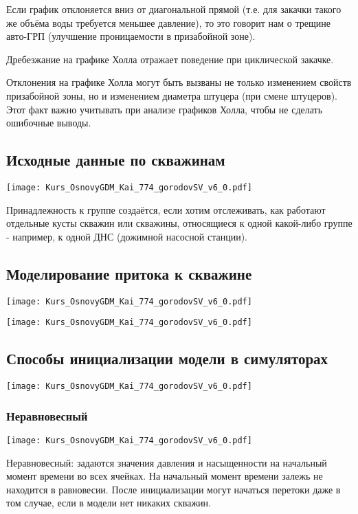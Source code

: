 \documentclass[main.tex]{subfiles}
\begin{document}
Если график отклоняется вниз от диагональной прямой (т.е. для закачки такого же объёма воды требуется меньшее давление), то это говорит нам о трещине  авто-ГРП (улучшение проницаемости в призабойной зоне).

Дребезжание на графике Холла отражает поведение при циклической закачке.

Отклонения на графике Холла могут быть вызваны не только изменением свойств призабойной зоны, но и изменением диаметра штуцера (при смене штуцеров). Этот факт важно учитывать при анализе графиков Холла, чтобы не сделать ошибочные выводы. 

\subsection{Исходные данные по скважинам}

\texttt{[image: Kurs\_OsnovyGDM\_Kai\_774\_gorodovSV\_v6\_0.pdf]}

Принадлежность к группе создаётся, если хотим отслеживать, как работают отдельные кусты скважин или скважины, относящиеся к одной какой-либо группе - например, к одной ДНС (дожимной насосной станции).

\subsection{Моделирование притока к скважине}

\texttt{[image: Kurs\_OsnovyGDM\_Kai\_774\_gorodovSV\_v6\_0.pdf]}

\texttt{[image: Kurs\_OsnovyGDM\_Kai\_774\_gorodovSV\_v6\_0.pdf]}

\subsection{Способы инициализации модели в симуляторах}

\texttt{[image: Kurs\_OsnovyGDM\_Kai\_774\_gorodovSV\_v6\_0.pdf]}

\subsubsection{Неравновесный}

\texttt{[image: Kurs\_OsnovyGDM\_Kai\_774\_gorodovSV\_v6\_0.pdf]}

Неравновесный: задаются значения давления и насыщенности на начальный момент времени во всех ячейках.
На начальный момент времени залежь не находится в равновесии. После инициализации могут начаться перетоки даже в том случае, если в модели нет никаких скважин.
\end{document}
